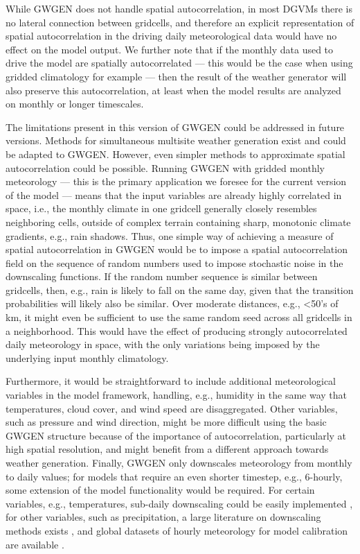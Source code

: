 \begin{refsection}
While GWGEN does not handle spatial autocorrelation, in most DGVMs there is no lateral connection between gridcells, and therefore an explicit representation of spatial autocorrelation in the driving daily meteorological data would have no effect on the model output. We further note that if the monthly data used to drive the model are spatially autocorrelated --– this would be the case when using gridded climatology for example --– then the result of the weather generator will also preserve this autocorrelation, at least when the model results are analyzed on monthly or longer timescales.

The limitations present in this version of GWGEN could be addressed in future versions. Methods for simultaneous multisite weather generation exist \citep{Wilks1998,Wilks1999a,Wilks1999b} and could be adapted to GWGEN. However, even simpler methods to approximate spatial autocorrelation could be possible. Running GWGEN with gridded monthly meteorology --- this is the primary application we foresee for the current version of the model --- means that the input variables are already highly correlated in space, i.e., the monthly climate in one gridcell generally closely resembles neighboring cells, outside of complex terrain containing sharp, monotonic climate gradients, e.g., rain shadows. Thus, one simple way of achieving a measure of spatial autocorrelation in GWGEN would be to impose a spatial autocorrelation field on the sequence of random numbers used to impose stochastic noise in the downscaling functions. If the random number sequence is similar between gridcells, then, e.g., rain is likely to fall on the same day, given that the transition probabilities will likely also be similar. Over moderate distances, e.g., <50's of km, it might even be sufficient to use the same random seed across all gridcells in a neighborhood. This would have the effect of producing strongly autocorrelated daily meteorology in space, with the only variations being imposed by the underlying input monthly climatology.

Furthermore, it would be straightforward to include additional meteorological variables in the model framework, handling, e.g., humidity in the same way that temperatures, cloud cover, and wind speed are disaggregated. Other variables, such as pressure and wind direction, might be more difficult using the basic GWGEN structure because of the importance of autocorrelation, particularly at high spatial resolution, and might benefit from a different approach towards weather generation. Finally, GWGEN only downscales meteorology from monthly to daily values; for models that require an even shorter timestep, e.g., 6-hourly, some extension of the model functionality would be required. For certain variables, e.g., temperatures, sub-daily downscaling could be easily implemented \citep{CesaraccioSpanoDuceEtAl2001}, for other variables, such as precipitation, a large literature on downscaling methods exists \citep[e.g.][]{BennettRobertsonWardEtAl2016}, and global datasets of hourly meteorology for model calibration are available \citep[e.g., the Integrated Surface Database,][]{SmithLottVose2011}.



\end{refsection}
